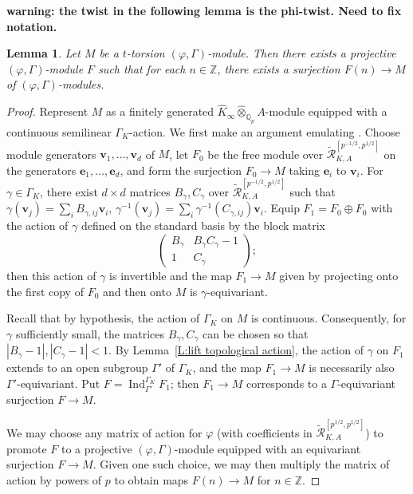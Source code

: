 \documentclass[12pt]{amsart}
\newtheorem{lemma}[theorem]{Lemma}
\theoremstyle{definition}
\numberwithin{equation}{theorem}
\newcommand{\be}{\mathbf{e}}
\newcommand{\bv}{\mathbf{v}}
\newcommand{\Qp}{\mathbb{Q}_p}
\newcommand{\ZZ}{\mathbb{Z}}
\newcommand{\calR}{\mathcal{R}}
\DeclareMathOperator{\Ind}{Ind}
\begin{document}
\textbf{warning: the twist in the following lemma is the phi-twist. Need to fix notation.}
\begin{lemma} \label{L:lift torsion action}
Let $M$ be a $t$-torsion $(\varphi, \Gamma)$-module. Then there exists
a projective $(\varphi, \Gamma)$-module $F$ such that for each $n \in \ZZ$, there exists a surjection $F(n) \to M$ of $(\varphi, \Gamma)$-modules.
\end{lemma}
\begin{proof}
Represent $M$ as a finitely generated $\widehat{K}_{\infty} \widehat{\otimes}_{\Qp} A$-module equipped with a continuous semilinear $\Gamma_K$-action.
We first make an argument emulating \cite[Lemma~1.5.2]{kedlaya-liu1}.
Choose module generators $\bv_1,\dots,\bv_d$ of $M$,
let $F_0$ be the free module over $\tilde{\calR}^{[p^{-1/2}, p^{1/2}]}_{K,A}$ on the
generators $\be_1,\dots,\be_d$, and form the surjection $F_0 \to M$ taking $\be_i$ to $\bv_i$. For $\gamma \in \Gamma_K$, there exist $d \times d$ matrices
$B_\gamma, C_\gamma$ over $\tilde{\calR}^{[p^{-1/2}, p^{1/2}]}_{K,A}$ such that
$\gamma(\bv_j) = \sum_i B_{\gamma,ij} \bv_i$, $\gamma^{-1}(\bv_j) = \sum_i \gamma^{-1}(C_{\gamma,ij}) \bv_i$. Equip $F_1 = F_0 \oplus F_0$ with the action of $\gamma$ defined on the standard basis by the block matrix
\[
\begin{pmatrix} B_\gamma & B_\gamma C_\gamma -1 \\ 1 & C_\gamma
\end{pmatrix};
\]
then this action of $\gamma$ is invertible and the map $F_1 \to M$ given by projecting onto the first copy of $F_0$ and then onto $M$ is $\gamma$-equivariant.

Recall that by hypothesis, the action of $\Gamma_K$ on $M$ is continuous. Consequently,
for $\gamma$ sufficiently small, the matrices $B_\gamma, C_\gamma$ can be chosen so that
$\left| B_\gamma-1 \right|, \left| C_\gamma -1 \right| < 1$.
By Lemma~\ref{L:lift topological action}, the action of $\gamma$ on $F_1$ extends to an open subgroup $\Gamma'$ of $\Gamma_K$, and the map $F_1 \to M$ is necessarily also $\Gamma'$-equivariant. Put $F = \Ind_{\Gamma'}^{\Gamma_K} F_1$; then $F_1 \to M$ corresponds to a $\Gamma$-equivariant surjection $F \to M$. 

We may choose any matrix of action for $\varphi$ (with coefficients in $\tilde{\calR}^{[p^{1/2}, p^{1/2}]}_{K,A}$)
to promote $F$ to a projective $(\varphi, \Gamma)$-module equipped with an equivariant surjection $F \to M$. Given one such choice, we may then multiply the matrix of action by powers of $p$ to obtain maps $F(n) \to M$ for $n \in \ZZ$. 
\end{proof}
\end{document}
